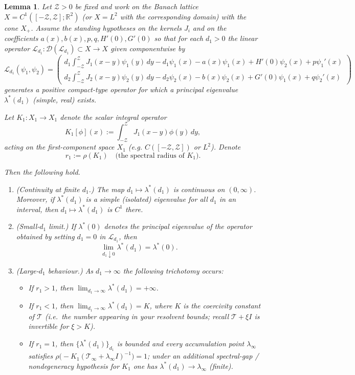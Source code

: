 \documentclass[a4paper,11pt]{amsart}
\newtheorem{lemma}[theorem]{Lemma}
\theoremstyle{definition}
\numberwithin{equation}{section}
\theoremstyle{definition}
\begin{document}
\begin{lemma}\label{lem:lambda_d1_limits}
Let ${\mathcal Z}>0$ be fixed and work on the Banach lattice
\(X=C^1([-\mathcal Z,\mathcal Z];\mathbb R^2)\) (or \(X=L^2\) with the corresponding domain)
with the cone \(X_+\). Assume the standing hypotheses on the kernels $J_i$ and on the coefficients
$a(x),b(x),p,q,H'(0),G'(0)$ so that for each $d_1>0$ the linear operator
\(\mathcal L_{d_1}:\mathcal D(\mathcal L_{d_1})\subset X\to X\) given componentwise by
\[
\mathcal L_{d_1}(\psi_1,\psi_2)
=
\begin{pmatrix}
d_1\displaystyle\int_{-{\mathcal Z}}^{\mathcal Z}J_1(x-y)\psi_1(y)\,dy - d_1\psi_1(x) - a(x)\psi_1(x) + H'(0)\psi_2(x) + p\psi_1'(x)\\[6pt]
d_2\displaystyle\int_{-{\mathcal Z}}^{\mathcal Z}J_2(x-y)\psi_2(y)\,dy - d_2\psi_2(x) - b(x)\psi_2(x) + G'(0)\psi_1(x) + q\psi_2'(x)
\end{pmatrix}
\]
generates a positive compact-type operator for which a principal eigenvalue \(\lambda^\ast(d_1)\) (simple, real) exists.

Let \(K_1:X_1\to X_1\) denote the scalar integral operator
\[
K_1[\phi](x):=\int_{-{\mathcal Z}}^{\mathcal Z}J_1(x-y)\phi(y)\,dy,
\]
acting on the first-component space \(X_1\) (e.g. \(C([-{\mathcal Z},{\mathcal Z}])\) or \(L^2\)). Denote
\[
r_1:=\rho(K_1)\quad\text{(the spectral radius of }K_1\text{).}
\]

Then the following hold.
\begin{enumerate}
\item (Continuity at finite \(d_1\).) The map \(d_1\mapsto\lambda^\ast(d_1)\) is continuous on \((0,\infty)\). Moreover,
if \(\lambda^\ast(d_1)\) is a simple (isolated) eigenvalue for all \(d_1\) in an interval, then \(d_1\mapsto\lambda^\ast(d_1)\) is \(C^1\) there.

\item (Small-\(d_1\) limit.) If \(\lambda^\ast(0)\) denotes the principal eigenvalue of the operator obtained by setting \(d_1=0\) in \(\mathcal L_{d_1}\), then
\[
\lim_{d_1\downarrow 0}\lambda^\ast(d_1)=\lambda^\ast(0).
\]

\item (Large-\(d_1\) behaviour.) As \(d_1\to\infty\) the following trichotomy occurs:
\begin{itemize}
  \item If \(r_1>1\), then \(\displaystyle \lim_{d_1\to\infty}\lambda^\ast(d_1)=+\infty\).
  \item If \(r_1<1\), then \(\displaystyle \lim_{d_1\to\infty}\lambda^\ast(d_1)=K\), where \(K\) is the coercivity constant of \(\mathscr T\) (i.e.\ the number appearing in your resolvent bounds; recall \(\mathscr T+\xi I\) is invertible for \(\xi>K\)).
  \item If \(r_1=1\), then \(\{\lambda^\ast(d_1)\}_{d_1}\) is bounded and every accumulation point \(\lambda_\infty\) satisfies
  \(\rho\!\big(-K_1(\mathscr T_\infty+\lambda_\infty I)^{-1}\big)=1\); under an additional spectral-gap / nondegeneracy hypothesis for \(K_1\) one has \(\lambda^\ast(d_1)\to\lambda_\infty\) (finite).
\end{itemize}
\end{enumerate}
\end{lemma}
\end{document}
